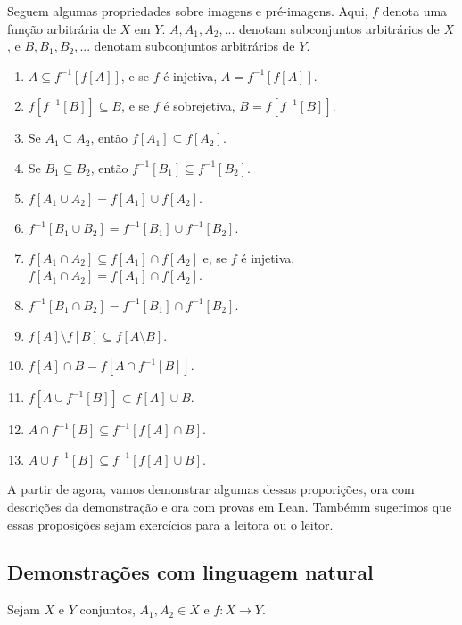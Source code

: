 Seguem algumas propriedades sobre imagens e pré-imagens. Aqui, $f$ denota uma
função arbitrária de $X$ em $Y$. $A, A_1, A_2, ...$ denotam subconjuntos
arbitrários de $X$, e $B, B_1, B_2,...$ denotam subconjuntos arbitrários de
$Y$.

\begin{enumerate}
    \label{iden}
    \item $A \subseteq f^{-1}[f[A]]$, e se $f$ é injetiva, $A = f^{-1}[f[A]]$.
    \item $f[f^{-1}[B]] \subseteq B$, e se $f$ é sobrejetiva, $B =
    f[f^{-1}[B]]$.
    \item Se $A_1 \subseteq A_2$, então $f[A_1] \subseteq f[A_2]$.
    \item Se $B_1 \subseteq B_2$, então $f^{-1}[B_1] \subseteq f^{-1}[B_2]$.
    \item $f[A_1 \cup A_2] = f[A_1] \cup f[A_2]$.
    \item $f^{-1}[B_1 \cup B_2] = f^{-1}[B_1] \cup f^{-1}[B_2]$.
    \item $f[A_1 \cap A_2] \subseteq f[A_1] \cap f[A_2]$ e, se $f$ é injetiva,
    $f[A_1 \cap A_2] = f[A_1] \cap f[A_2]$.
    \item $f^{-1}[B_1 \cap B_2] = f^{-1}[B_1] \cap f^{-1}[B_2]$.
    \item $f[A] \setminus f[B] \subseteq f[A\setminus B]$.
    \item $f[A] \cap B = f[A \cap f^{-1}[B]]$.
    \item $f[A \cup f^{-1}[B]] \subset f[A] \cup B $.
    \item $A \cap f^{-1}[B] \subseteq f^{-1}[f[A] \cap B]$.
    \item $A \cup f^{-1}[B] \subseteq f^{-1}[f[A] \cup B]$.
\end{enumerate}

A partir de agora, vamos demonstrar algumas dessas proporições, ora com
descrições da demonstração e ora com provas em Lean. Tambémm sugerimos que
essas proposições sejam exercícios para a leitora ou o leitor.

\subsection{Demonstrações com linguagem natural}

\begin{theorem}[Item 7]
    \label{exerc1}
    Sejam $X$ e $Y$ conjuntos, $A_1, A_2 \in X$ e $f: X \to Y$.
\end{theorem}

